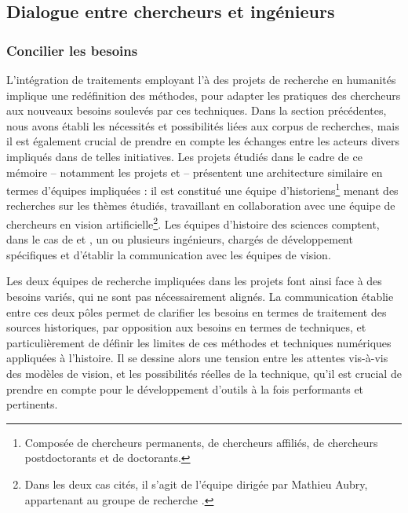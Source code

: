 
\subsection{Dialogue entre chercheurs et ingénieurs}
    \subsubsection{Concilier les besoins}
	L'intégration de traitements employant l'\ia à des projets de recherche en humanités implique une redéfinition des méthodes, pour adapter les pratiques des chercheurs aux nouveaux besoins soulevés par ces techniques. Dans la section précédentes, nous avons établi les nécessités et possibilités liées aux corpus de recherches, mais il est également crucial de prendre en compte les échanges entre les acteurs divers impliqués dans de telles initiatives. Les projets étudiés dans le cadre de ce mémoire -- notamment les projets \eida et \vhs -- présentent une architecture similaire en termes d'équipes impliquées : il est constitué une équipe d'historiens\footnote{Composée de chercheurs permanents, de chercheurs affiliés, de chercheurs postdoctorants et de doctorants.} menant des recherches sur les thèmes étudiés, travaillant en collaboration avec une équipe de chercheurs en vision artificielle\footnote{Dans les deux cas cités, il s'agit de l'équipe dirigée par Mathieu Aubry, appartenant au groupe de recherche \imagine.}. Les équipes d'histoire des sciences comptent, dans le cas de \vhs et \eida, un ou plusieurs ingénieurs, chargés de développement spécifiques et d'établir la communication avec les équipes de vision.
	
	Les deux équipes de recherche impliquées dans les projets font ainsi face à des besoins variés, qui ne sont pas nécessairement alignés. La communication établie entre ces deux pôles permet de clarifier les besoins en termes de traitement des sources historiques, par opposition aux besoins en termes de techniques, et particulièrement de définir les limites de ces méthodes et techniques numériques appliquées à l'histoire. Il se dessine alors une tension entre les attentes vis-à-vis des modèles de vision, et les possibilités réelles de la technique, qu'il est crucial de prendre en compte pour le développement d'outils à la fois performants et pertinents.
    
